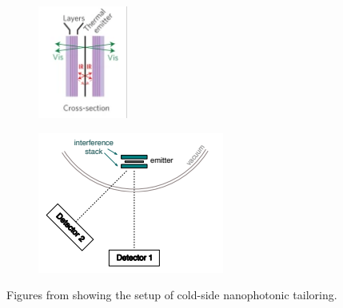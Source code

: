 \documentclass[%
 reprint,
 amsmath,amssymb,
 aps
]{revtex4-2}
\begin{document}
\begin{figure}
\centering
\begin{subfigure}{.25\textwidth}
  \centering
  \includegraphics[width=.8\linewidth]{setup.PNG}
  \label{fig:sub1}
\end{subfigure}%
\begin{subfigure}{.25\textwidth}
  \centering
  \includegraphics[width=.8\linewidth]{experimental_setup.PNG}
  \label{fig:sub2}
\end{subfigure}
\caption{Figures from \cite{ilic} showing the setup of cold-side nanophotonic tailoring.}
\label{fig:test}
\end{figure}
\end{document}
